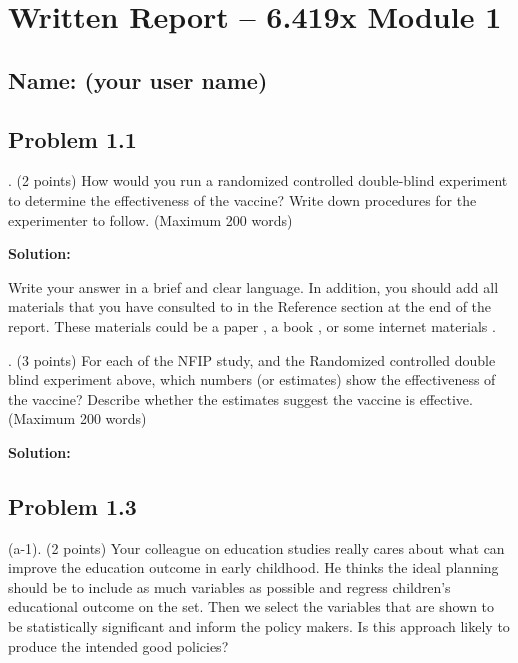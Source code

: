 \documentclass[11pt]{article}
\newenvironment{question}
  {\itshape\list{}{\leftmargin=0em\rightmargin=0em}%
   \item\relax}
  {\endlist\ignorespacesafterend}
\newenvironment{solution}
  {\textbf{Solution: }\list{}{\leftmargin=1em\rightmargin=0em}%
   \item\relax}
  {\endlist\ignorespacesafterend}
\begin{document}
\section*{\centering Written Report – 6.419x Module 1}
\subsection*{\raggedleft Name: (your user name)}


\subsection*{Problem 1.1}
\begin{question}
1. (2 points) 
How would you run a randomized controlled double-blind experiment to determine the effectiveness of the vaccine? Write down procedures for the experimenter to follow. 
(Maximum 200 words)
\end{question}

\begin{solution}
Write your answer in a brief and clear language. In addition, you should add all materials that you have consulted to in the Reference section at the end of the report.  These materials could be a paper \cite{Wasserstein:2016}, a book \cite{Gustavii:2017}, or some internet materials \cite{Wiki:PCA}.
\end{solution}

\begin{question}
2. (3 points) 
For each of the NFIP study, and the Randomized controlled double blind experiment above, which numbers (or estimates) show the effectiveness of the vaccine? Describe whether the estimates suggest the vaccine is effective.
(Maximum 200 words)
\end{question}

\begin{solution}
\end{solution}


\subsection*{Problem 1.3}
\begin{question}
(a-1). (2 points) 
Your colleague on education studies really cares about what can improve the education outcome in early childhood. He thinks the ideal planning should be to include as much variables as possible and regress children's educational outcome on the set. Then we select the variables that are shown to be statistically significant and inform the policy makers. Is this approach likely to produce the intended good policies?
\end{question}
\end{document}
